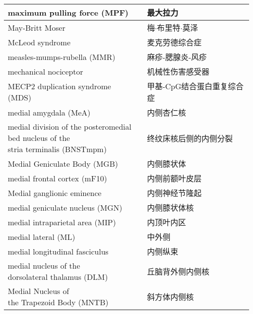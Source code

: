 \begin{longtable}{lll}
	\midrule
	maximum pulling force (MPF)   && 最大拉力  \\
	
	\midrule
	May-Britt Moser   && 梅$\cdot$布里特$\cdot$莫泽  \\
	
	\midrule
	McLeod syndrome   && 麦克劳德综合症  \\
	
	\midrule
	measles-mumps-rubella (MMR)   && 麻疹-腮腺炎-风疹  \\
	
	\midrule
	mechanical nociceptor   && 机械性伤害感受器  \\
	
	\midrule
	MECP2 duplication syndrome (MDS) && 甲基-CpG结合蛋白重复综合症  \\
	
	\midrule
	medial amygdala (MeA)  && 内侧杏仁核  \\
	
	\midrule
	\makecell[l]{medial division of the posteromedial\\ bed nucleus of the \\stria terminalis (BNSTmpm)}   && 终纹床核后侧的内侧分裂  \\
	
	\midrule
	Medial Geniculate Body (MGB)   && 内侧膝状体  \\
	
	\midrule
	medial frontal cortex (mF10)   && 内侧前额叶皮层  \\
	
	\midrule
	Medial ganglionic eminence   && 内侧神经节隆起  \\
	
	\midrule
	medial geniculate nucleus (MGN)  && 内侧膝状体核  \\
	
	\midrule
	medial intraparietal area (MIP)   && 内顶叶内区  \\
	
	\midrule
	medial lateral (ML)   && 中外侧  \\
	
	\midrule
	medial longitudinal fasciculus   && 内侧纵束  \\
	
	\midrule
	\makecell[l]{medial nucleus of the\\ dorsolateral thalamus (DLM)}  && 丘脑背外侧内侧核  \\
	
	\midrule
	\makecell[l]{Medial Nucleus of \\the Trapezoid Body (MNTB)}   && 斜方体内侧核  \\
	

\end{longtable}
